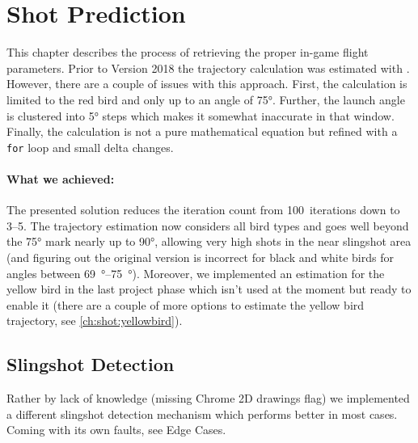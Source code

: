 \section{Shot Prediction}\label{ch:shot}

This chapter describes the process of retrieving the proper in-game flight parameters. Prior to Version 2018 the trajectory calculation was estimated with . However, there are a couple of issues with this approach. First, the calculation is limited to the red bird and only up to an angle of \ang{75}. Further, the launch angle is clustered into \ang{5} steps which makes it somewhat inaccurate in that window. Finally, the calculation is not a pure mathematical equation but refined with a \texttt{for} loop and small delta changes.

\paragraph{What we achieved:} The presented solution reduces the iteration count from \SI{100}{iterations} down to \numrange{3}{5}. The trajectory estimation now considers all bird types and goes well beyond the \ang{75} mark nearly up to \ang{90}, allowing very high shots in the near slingshot area (and figuring out the original version is incorrect for black and white birds for angles between \SIrange{69}{75}{\degree}). Moreover, we implemented an estimation for the yellow bird in the last project phase which isn't used at the moment but ready to enable it (there are a couple of more options to estimate the yellow bird trajectory, see \ref{ch:shot:yellowbird}).




\subsection{Slingshot Detection}
Rather by lack of knowledge (missing Chrome 2D drawings flag) we implemented a different slingshot detection mechanism which performs better in most cases. Coming with its own faults, see Edge Cases.

